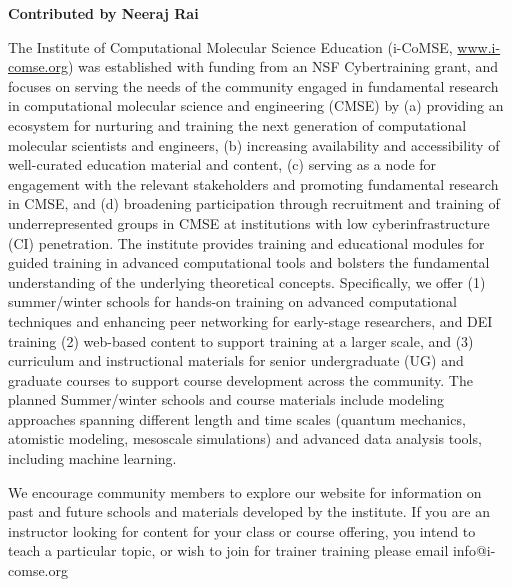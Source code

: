 \textbf{Contributed by Neeraj Rai}

The Institute of Computational Molecular Science Education (i-CoMSE, \href{www.i-comse.org}{www.i-comse.org}) was established with funding from an NSF Cybertraining grant, and focuses on serving the needs of the community engaged in fundamental research in computational molecular science and engineering (CMSE) by (a) providing an ecosystem for nurturing and training the next generation of computational molecular scientists and engineers, (b) increasing availability and accessibility of well-curated education material and content, (c) serving as a node for engagement with the relevant stakeholders and promoting fundamental research in CMSE, and (d) broadening participation through recruitment and training of underrepresented groups in CMSE at institutions with low cyberinfrastructure (CI) penetration. 
The institute provides training and educational modules for guided training in advanced computational tools and bolsters the fundamental understanding of the underlying theoretical concepts. Specifically, we offer (1) summer/winter schools for hands-on training on advanced computational techniques and enhancing peer networking for early-stage researchers, and DEI training (2) web-based content to support training at a larger scale, and (3) curriculum and instructional materials for senior undergraduate (UG) and graduate courses to support course development across the community. The planned Summer/winter schools and course materials include modeling approaches spanning different length and time scales (quantum mechanics, atomistic modeling, mesoscale simulations) and advanced data analysis tools, including machine learning. 

 We encourage community members to explore our website for information on past and future schools and materials developed by the institute. If you are an instructor looking for content for your class or course offering, you intend to teach a particular topic, or wish to join for trainer training please email info@i-comse.org